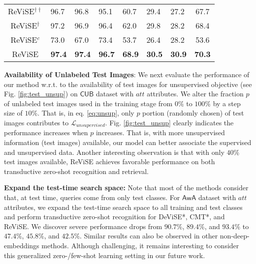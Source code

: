 {{\begin{table}[t!]
{\begin{tabular}{|c||lll||lll||c|}
ReViSE$^{\dagger\dagger}$&            96.7              &            96.8             &         95.1          &     60.7             &       29.4           &        27.2        &            67.7            \\
ReViSE$^{\dagger}$&              97.2            &               96.9          &          96.4                &    62.0           &       29.8            &        28.2       &        68.4          \\
ReViSE$^{c}$             &            73.0              &             67.0            &         73.4      &       53.7          &       26.4            &         28.2       &           53.6                \\
ReViSE                &          {\bf 97.4}                &          {\bf 97.4}               &         {\bf 96.7}            &      {\bf 68.9}           &       {\bf 30.5}      &        {\bf 30.9}          &          {\bf 70.3}           \\ \hline
\end{tabular}
}
\vspace{-4mm}
\label{tbl:zero_retr}
\end{table}

\vspace{0.1in}
\hspace{-5mm} {\bf Availability of Unlabeled Test Images}:
We next evaluate the performance of our method w.r.t. to the availability of test images for unsupervised objective (see Fig. \ref{fig:test_unsup}) on $\mathsf{CUB}$ dataset with $\textit{att}$ attributes. We alter the fraction $p$ of unlabeled test images used in the training stage from $0\%$ to $100\%$ by a step size of $10\%$. That is, in eq. \eqref{eq:unsup}, only $p$ portion (randomly chosen) of test images contributes to $\mathcal{L}_{unsupervised}$. 
Fig. \ref{fig:test_unsup} clearly indicates the performance increases when $p$ increases. That is, with more unsupervised information (test images) available, our model can better associate the supervised and unsupervised data.
Another interesting observation is that with only $40\%$ test images available, ReViSE achieves favorable performance on both transductive zero-shot recognition and retrieval. 

\hspace{-5mm} {\bf Expand the test-time search space:} Note that most of the methods \cite{frome2013devise,socher2013zero,norouzi2013zero,zhang2015zero,akata2015evaluation,zhang2016zero1,xian2016latent,changpinyo2016synthesized,fu2015transductive} consider that, at test time, queries come from only test classes. For $\mathsf{AwA}$ dataset with $\textit{att}$ attributes, we expand the test-time search space to all training and test classes and perform transductive zero-shot recognition for DeViSE*, CMT*, and ReViSE. We discover severe performance drops from $90.7\%$, $89.4\%$, and $93.4\%$ to $47.4\%$, $45.8\%$, and $42.5\%$. Similar results can also be observed in other non-deep-embeddings methods. Although challenging, it remains interesting to consider this generalized zero-/few-shot learning setting in our future work.


}}
